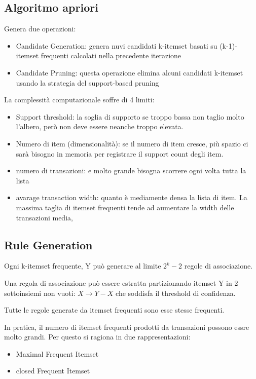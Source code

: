\subsection{Algoritmo apriori}
Genera due operazioni:
\begin{itemize}
	\item Candidate Generation: genera nuvi candidati k-itemset basati su (k-1)-itemset frequenti calcolati nella precedente iterazione
	\item Candidate Pruning: questa operazione elimina alcuni candidati k-itemset usando la strategia del support-based pruning
\end{itemize}

La complessit\`a computazionale soffre di 4 limiti:
\begin{itemize}
	\item Support threshold: la soglia di supporto se troppo bassa non taglio molto l'albero, per\`o non deve essere neanche troppo elevata. 
	\item Numero di item (dimensionalit\`a): se il numero di item cresce, pi\`u spazio ci sar\`a bisogno in memoria per registrare il support count degli item.
	\item numero di transazioni: e molto grande bisogna scorrere ogni volta tutta la lista
	\item avarage transaction width: quanto \`e mediamente densa la lista di item. La massima taglia di itemset frequenti tende ad aumentare la width delle transazioni media,
\end{itemize}

\subsection{Rule Generation}
Ogni k-itemset frequente, Y pu\`o generare al limite $2^k-2$ regole di associazione. 

Una regola di associazione pu\`o essere estratta partizionando itemset Y in 2 sottoinsiemi non vuoti: $X \rightarrow Y -X$ che soddisfa il threshold di confidenza.

Tutte le regole generate da itemset frequenti sono esse stesse frequenti.

In pratica, il numero di itemset frequenti prodotti da transazioni possono essre molto grandi. Per questo si ragiona in due rappresentazioni:
\begin{itemize}
	\item Maximal Frequent Itemset
	\item closed Frequent Itemset
\end{itemize}

